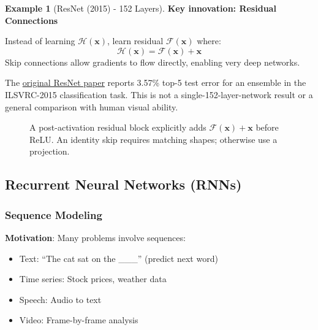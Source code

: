 \documentclass[11pt,twoside]{article}
\numberwithin{equation}{section}
\newcommand{\vect}[1]{\bm{#1}}
\theoremstyle{plain}
\theoremstyle{definition}
\newtheorem{example}[theorem]{Example}
\theoremstyle{remark}
\begin{document}
\begin{example}[ResNet (2015) - 152 Layers]
\textbf{Key innovation: Residual Connections}

Instead of learning $\mathcal{H}(\vect{x})$, learn residual $\mathcal{F}(\vect{x})$ where:
\[
\mathcal{H}(\vect{x}) = \mathcal{F}(\vect{x}) + \vect{x}
\]
Skip connections allow gradients to flow directly, enabling very deep networks.

The \href{https://arxiv.org/abs/1512.03385}{original ResNet paper} reports 3.57\% top-5 test error for an ensemble in the ILSVRC-2015 classification task. This is not a single-152-layer-network result or a general comparison with human visual ability.
\end{example}

\begin{figure}[H]
\centering
{}
\caption{A post-activation residual block explicitly adds $\mathcal F(\vect{x})+\vect{x}$ before ReLU. An identity skip requires matching shapes; otherwise use a projection.}
\end{figure}

\subsection{Recurrent Neural Networks (RNNs)}

\subsubsection{Sequence Modeling}

\textbf{Motivation}: Many problems involve sequences:
\begin{itemize}
\item Text: ``The cat sat on the \_\_\_'' (predict next word)
\item Time series: Stock prices, weather data
\item Speech: Audio to text
\item Video: Frame-by-frame analysis
\end{itemize}
\end{document}
